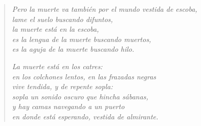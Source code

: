 \documentclass[12pt]{article}
\begin{document}
\begin{verse}
\emph{Pero la muerte va también por el mundo vestida de escoba,\\
lame el suelo buscando difuntos,\\
la muerte está en la escoba,\\
es la lengua de la muerte buscando muertos,\\
es la aguja de la muerte buscando hilo.}  

\emph{La muerte está en los catres:\\
en los colchones lentos, en las frazadas negras\\
vive tendida, y de repente sopla:\\
sopla un sonido oscuro que hincha sábanas,\\
y hay camas navegando a un puerto\\
en donde está esperando, vestida de almirante.}  

\end{verse}
\end{document}
